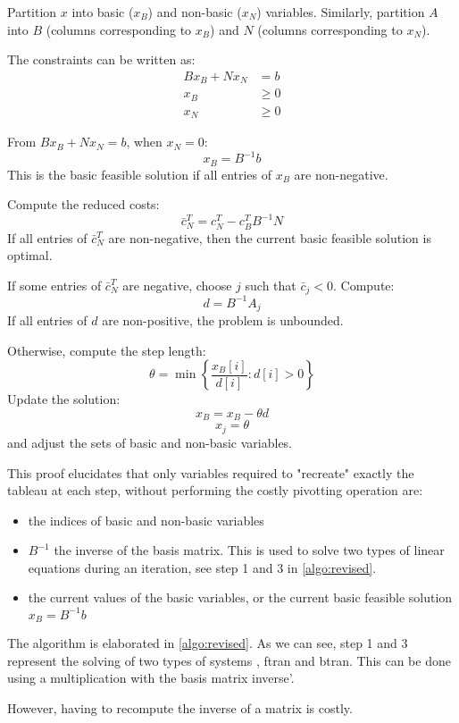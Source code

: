 Partition \( x \) into basic (\( x_B \)) and non-basic (\( x_N \)) variables.
Similarly, partition \( A \) into \( B \) (columns corresponding to \( x_B \))
and \( N \) (columns corresponding to \( x_N \)).

The constraints can be written as:
\begin{align*}
    Bx_B + Nx_N & = b    \\
    x_B         & \geq 0 \\
    x_N         & \geq 0
\end{align*}

From \( Bx_B + Nx_N = b \), when \( x_N = 0 \):
\[ x_B = B^{-1}b \]
This is the basic feasible solution if all entries of \( x_B \) are non-negative.

Compute the reduced costs:
\[ \bar{c}_N^T = c_N^T - c_B^T B^{-1} N \]
If all entries of \( \bar{c}_N^T \) are non-negative,
then the current basic feasible solution is optimal.

If some entries of \( \bar{c}_N^T \) are negative,
choose \( j \) such that \( \bar{c}_j < 0 \). Compute:
\[ d = B^{-1} A_j \]
If all entries of \( d \) are non-positive, the problem is unbounded.

Otherwise, compute the step length:
\[ \theta = \min \left\{ \frac{x_B[i]}{d[i]} : d[i] > 0 \right\} \]
Update the solution:
\[ x_B = x_B - \theta d \]
\[ x_j = \theta \]
and adjust the sets of basic and non-basic variables.

This proof elucidates that only variables required to "recreate" exactly the tableau at
each step, without performing the costly pivotting operation are:
\begin{itemize}
    \item the indices of basic and non-basic variables
    \item $B^{-1}$ the inverse of the basis matrix. This is used to solve two types of linear equations
          during an iteration, see step 1 and 3 in \ref{algo:revised}.
    \item the current values of the basic variables, or the current basic feasible solution $x_B = B^{-1}b$
\end{itemize}

The algorithm is elaborated in \ref{algo:revised}. As we can see, step 1 and 3 represent the solving of
two types of systems , \gls{ftran} and \gls{btran}. This can be done using a multiplication with
the basis matrix inverse'.

However, having to recompute the inverse of a matrix is costly.

